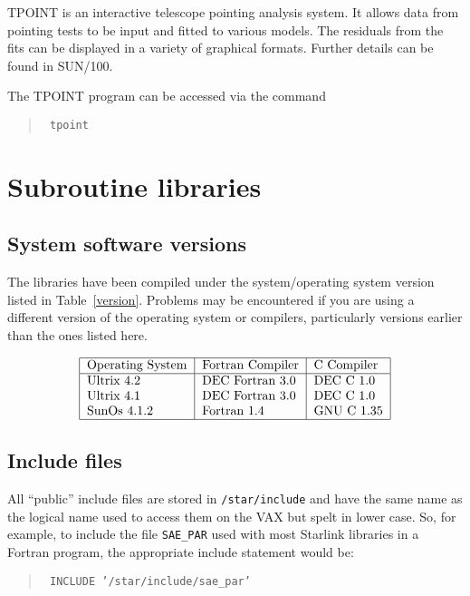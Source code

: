 TPOINT is an interactive telescope pointing analysis system. It allows
data from pointing tests to be input and fitted to various models. The
residuals from the fits can be displayed in a variety of graphical
formats. Further details can be found in SUN/100.

The TPOINT program can be accessed via the command

\begin{quote}\tt
tpoint
\end{quote}


\section{Subroutine libraries}

\subsection{System software versions}

The libraries have been compiled under the system/operating system version
listed in Table~\ref{version}. Problems may be encountered if you are using a
different version of the operating system or compilers, particularly versions
earlier than the ones listed here.
\begin{table}[ht]\caption{Supported software versions}\label{version}
\[\begin{tabular}{|l|l|l|}
\hline
Operating System &Fortran Compiler &C Compiler\\
\hline
Ultrix 4.2  &DEC Fortran 3.0 &DEC C 1.0  \\
Ultrix 4.1  &DEC Fortran 3.0 &DEC C 1.0  \\
SunOs 4.1.2 &Fortran 1.4     &GNU C 1.35 \\
\hline
\end{tabular}\]
\end{table}
\subsection{Include files}

All ``public'' include files are stored in {\tt /star/include} and have the
same name as the logical name used to access them on the VAX but spelt in lower
case. So, for example,
to include the file {\tt SAE\_PAR} used with most Starlink libraries in a
Fortran program, the appropriate include statement would be:
\begin{quote}\tt
INCLUDE '/star/include/sae\_par'
\end{quote}

